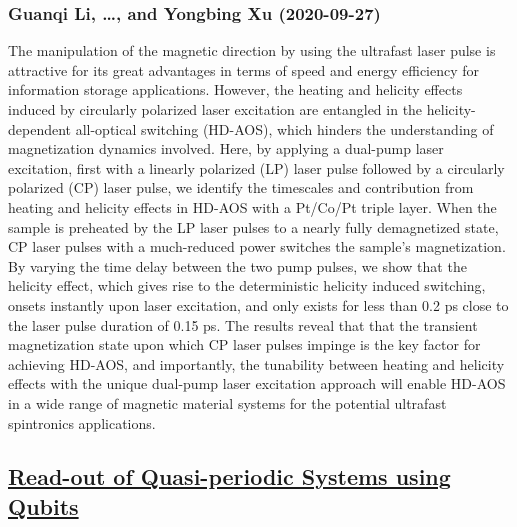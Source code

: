 \subsubsection*{Guanqi Li, \dots, and Yongbing Xu (2020-09-27)}
The manipulation of the magnetic direction by using the ultrafast laser pulse
is attractive for its great advantages in terms of speed and energy efficiency
for information storage applications. However, the heating and helicity effects
induced by circularly polarized laser excitation are entangled in the
helicity-dependent all-optical switching (HD-AOS), which hinders the
understanding of magnetization dynamics involved. Here, by applying a dual-pump
laser excitation, first with a linearly polarized (LP) laser pulse followed by
a circularly polarized (CP) laser pulse, we identify the timescales and
contribution from heating and helicity effects in HD-AOS with a Pt/Co/Pt triple
layer. When the sample is preheated by the LP laser pulses to a nearly fully
demagnetized state, CP laser pulses with a much-reduced power switches the
sample's magnetization. By varying the time delay between the two pump pulses,
we show that the helicity effect, which gives rise to the deterministic
helicity induced switching, onsets instantly upon laser excitation, and only
exists for less than 0.2 ps close to the laser pulse duration of 0.15 ps. The
results reveal that that the transient magnetization state upon which CP laser
pulses impinge is the key factor for achieving HD-AOS, and importantly, the
tunability between heating and helicity effects with the unique dual-pump laser
excitation approach will enable HD-AOS in a wide range of magnetic material
systems for the potential ultrafast spintronics applications.

\subsection*{\href{http://arxiv.org/abs/2009.12813v1}{Read-out of Quasi-periodic Systems using Qubits}}
